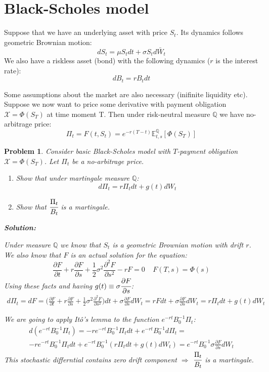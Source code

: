 \documentclass[a4paper, 12pt]{article}
\theoremstyle{problemstyle}
\newtheorem{problem}{Problem}[section]
\newenvironment{solution}
{\textit{\textbf{Solution:}}}
{}
\newcommand{\E}{\mathbb{E}}
\begin{document}
\section{Black-Scholes model}
Suppose that we have an underlying asset with price $S_t$. Its dynamics follows geometric Brownian motion:
$$
dS_t = \mu S_tdt + \sigma S_t d\bar{W}_t
$$
We also have a riskless asset (bond) with the following dynamics ($r$ is the interest rate):
$$
dB_t = rB_tdt
$$


 Some assumptions about the market are also necessary (inifinite liquidity etc). 
Suppose we now want to price some derivative with payment obligation $\mathcal{X} = \Phi(S_T)$ at time moment T. Then under risk-neutral measure $\mathbb{Q}$ we have no-arbitrage price:
$$
\Pi_t = F(t, S_t) = e^{-r(T-t)}\E^{\mathbb{Q}}_{t, s} [\Phi(S_T)]
$$
\begin{problem}
	Consider basic Black-Scholes model with $T$-payment obligation $\mathcal{X} = \Phi(S_T)$. Let $\Pi_t$ be a no-arbitrage price.
	\begin{enumerate}
		\item[a)] Show that under martingale measure $\mathbb{Q}$:
		$$
		d\Pi_t = r \Pi_t dt + g(t) dW_t
		$$ 
		
		\item[b)]
		Show that $\cfrac{\Pi_t}{B_t}$ is a martingale.
	\end{enumerate}
	\begin{solution}
		\item[a)] Under measure $\mathbb{Q}$ we know that $S_t$ is a geometric Brownian motion with drift $r$. We also know that $F$ is an actual solution for the equation:
		$$
		\frac{\partial F}{\partial t}  +  r \frac{\partial F}{\partial s} + \frac{1}{2} \sigma^2 \frac{\partial^2 F}{\partial s^2 }
		-r F = 0
		\;\;\;\; F(T, s) = \Phi(s)
		$$  
		Using these facts and having $g(t) \equiv \sigma \cfrac{\partial F}{\partial s}$:
		\begin{multline}
		d\Pi_t = dF = \bigg(\frac{\partial F}{\partial t}  +  r \frac{\partial F}{\partial s} + \frac{1}{2} \sigma^2 \frac{\partial^2 F}{\partial s^2 }\bigg)dt + \sigma \frac{\partial F}{\partial s} dW_t = rF dt+ \sigma \frac{\partial F}{\partial s} dW_t  = r\Pi_t dt + g(t) dW_t
		\end{multline}
		
		\item[b)] We are going to apply Itô's lemma to the function $e^{-rt}B_0^{-1}\Pi_t$:
		\begin{multline}
		d(e^{-rt}B_0^{-1}\Pi_t) = -re^{-rt}B_0^{-1}\Pi_t dt +e^{-rt}B_0^{-1}d\Pi_t = \\
		 -re^{-rt}B_0^{-1}\Pi_t dt + e^{-rt}B_0^{-1}(r\Pi_t dt + g(t) dW_t) = 
		 e^{-rt}B_0^{-1} \sigma \frac{\partial F}{\partial s} dW_t
		\end{multline}
		This stochastic differntial contains zero drift component $\Rightarrow$ $\cfrac{\Pi_t}{B_t}$ is a martingale.
	\end{solution}
\end{problem}
\end{document}
